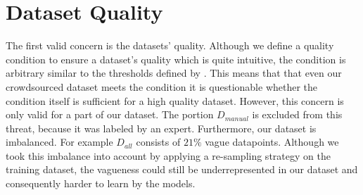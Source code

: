 \section{Dataset Quality}
\label{chp:threats_to_validity:sec:dataset_quality}

The first valid concern is the datasets' quality.
Although we define a quality condition to ensure a dataset's quality which is quite intuitive, the condition is arbitrary similar to the thresholds defined by \textcite{Landis:1977}.
This means that that even our crowdsourced dataset meets the condition it is questionable whether the condition itself is sufficient for a high quality dataset.
However, this concern is only valid for a part of our dataset.
The portion $D_{manual}$ is excluded from this threat, because it was labeled by an expert.
Furthermore, our dataset is imbalanced.
For example $D_{all}$ consists of $21\%$ vague datapoints.
Although we took this imbalance into account by applying a re-sampling strategy on the training dataset, the vagueness could still be underrepresented in our dataset and consequently harder to learn by the models.
